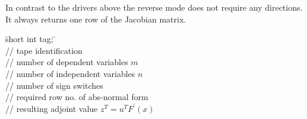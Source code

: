 In contrast to the drivers above the reverse mode does not require any directions. 
It always returns one row of the Jacobian matrix.

\begin{tabbing}
\hspace{0.5in}\={\sf short int tag;} \hspace{1.1in}\= \kill    %
\\
         \> // tape identification \\
                 \> // number of dependent variables $m$\\
                 \> // number of independent variables $n$\\
                 \> // number of sign switches\\
            \> // required row no. of abs-normal form \\
           \> // resulting adjoint value $z^T = u^T F^\prime (x)$\\
\end{tabbing}


